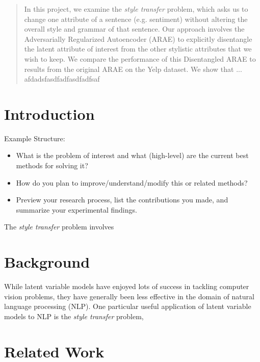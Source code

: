 \documentclass{article}
\begin{document}

\begin{abstract}
In this project, we examine the \emph{style transfer} problem, which asks us to change one attribute of a sentence (e.g. sentiment) without altering the overall style and grammar of that sentence.  Our approach involves the Adversarially Regularized Autoencoder (ARAE) \cite{arae} to explicitly disentangle the latent attribute of interest from the other stylistic attributes that we wish to keep.  We compare the performance of this Disentangled ARAE to results from the original ARAE on the Yelp dataset.  We show that ... afdadsfasdfadfasdfadfsaf  
\end{abstract}

\section{Introduction}
\label{sec:introduction}

Example Structure:
\begin{itemize}
\item What is the problem of interest and what (high-level) are the current best methods for solving it?
\item How do you plan to improve/understand/modify this or related methods?
\item Preview your research process, list the contributions you made, and summarize your experimental findings.
\end{itemize}
The \emph{style transfer} problem involves

\section{Background}
While latent variable models have enjoyed lots of success in tackling computer vision problems, they have generally been less effective in the domain of natural language processing (NLP).  One particular useful application of latent variable models to NLP is the \emph{style transfer} problem,


\section{Related Work}
\end{document}

